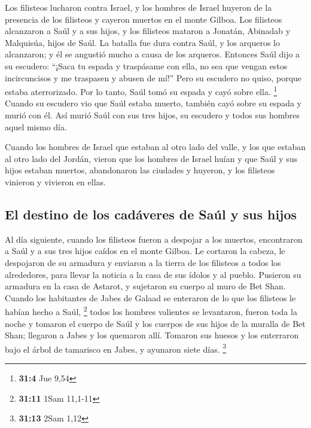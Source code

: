 \begin{paracol}{2}
 Los filisteos lucharon contra Israel, y los hombres de
Israel huyeron de la presencia de los filisteos y cayeron muertos en el
monte Gilboa.  Los filisteos alcanzaron a Saúl y a sus
hijos, y los filisteos mataron a Jonatán, Abinadab y Malquisúa, hijos de
Saúl.  La batalla fue dura contra Saúl, y los arqueros lo
alcanzaron; y él se angustió mucho a causa de los arqueros.
 Entonces Saúl dijo a su escudero: ``¡Saca tu espada y
traspásame con ella, no sea que vengan estos incircuncisos y me
traspasen y abusen de mí!'' Pero su escudero no quiso, porque estaba
aterrorizado. Por lo tanto, Saúl tomó su espada y cayó sobre ella.
\footnote{\textbf{31:4} Jue 9,54}  Cuando su escudero vio
que Saúl estaba muerto, también cayó sobre su espada y murió con él.
 Así murió Saúl con sus tres hijos, su escudero y todos
sus hombres aquel mismo día.

 Cuando los hombres de Israel que estaban al otro lado del
valle, y los que estaban al otro lado del Jordán, vieron que los hombres
de Israel huían y que Saúl y sus hijos estaban muertos, abandonaron las
ciudades y huyeron, y los filisteos vinieron y vivieron en ellas.

\hypertarget{el-destino-de-los-caduxe1veres-de-sauxfal-y-sus-hijos}{%
\subsection{El destino de los cadáveres de Saúl y sus
hijos}\label{el-destino-de-los-caduxe1veres-de-sauxfal-y-sus-hijos}}

 Al día siguiente, cuando los filisteos fueron a despojar
a los muertos, encontraron a Saúl y a sus tres hijos caídos en el monte
Gilboa.  Le cortaron la cabeza, le despojaron de su
armadura y enviaron a la tierra de los filisteos a todos los
alrededores, para llevar la noticia a la casa de sus ídolos y al pueblo.
 Pusieron su armadura en la casa de Astarot, y sujetaron
su cuerpo al muro de Bet Shan.  Cuando los habitantes de
Jabes de Galaad se enteraron de lo que los filisteos le habían hecho a
Saúl, \footnote{\textbf{31:11} 1Sam 11,1-11}  todos los
hombres valientes se levantaron, fueron toda la noche y tomaron el
cuerpo de Saúl y los cuerpos de sus hijos de la muralla de Bet Shan;
llegaron a Jabes y los quemaron allí.  Tomaron sus huesos
y los enterraron bajo el árbol de tamarisco en Jabes, y ayunaron siete
días. \footnote{\textbf{31:13} 2Sam 1,12} \switchcolumn
\begin{otherlanguage}{english}


\end{otherlanguage}
\end{paracol}
